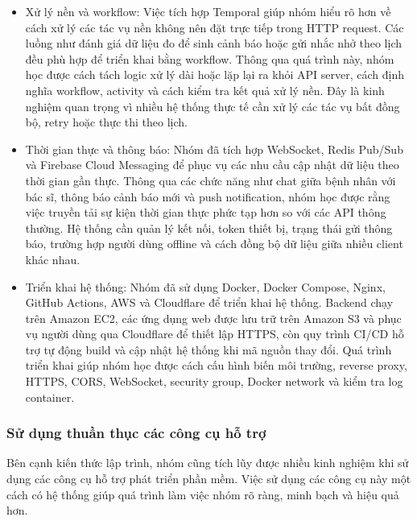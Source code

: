 \begin{itemize}
    \item Xử lý nền và workflow: Việc tích hợp Temporal giúp nhóm hiểu rõ hơn về cách xử lý các tác vụ nền không nên đặt trực tiếp trong HTTP request. Các luồng như đánh giá dữ liệu đo để sinh cảnh báo hoặc gửi nhắc nhở theo lịch đều phù hợp để triển khai bằng workflow. Thông qua quá trình này, nhóm học được cách tách logic xử lý dài hoặc lặp lại ra khỏi API server, cách định nghĩa workflow, activity và cách kiểm tra kết quả xử lý nền. Đây là kinh nghiệm quan trọng vì nhiều hệ thống thực tế cần xử lý các tác vụ bất đồng bộ, retry hoặc thực thi theo lịch.

    \item Thời gian thực và thông báo: Nhóm đã tích hợp WebSocket, Redis Pub/Sub và Firebase Cloud Messaging để phục vụ các nhu cầu cập nhật dữ liệu theo thời gian gần thực. Thông qua các chức năng như chat giữa bệnh nhân với bác sĩ, thông báo cảnh báo mới và push notification, nhóm học được rằng việc truyền tải sự kiện thời gian thực phức tạp hơn so với các API thông thường. Hệ thống cần quản lý kết nối, token thiết bị, trạng thái gửi thông báo, trường hợp người dùng offline và cách đồng bộ dữ liệu giữa nhiều client khác nhau.

    \item Triển khai hệ thống: Nhóm đã sử dụng Docker, Docker Compose, Nginx, GitHub Actions, AWS và Cloudflare để triển khai hệ thống. Backend chạy trên Amazon EC2, các ứng dụng web được lưu trữ trên Amazon S3 và phục vụ người dùng qua Cloudflare để thiết lập HTTPS, còn quy trình CI/CD hỗ trợ tự động build và cập nhật hệ thống khi mã nguồn thay đổi. Quá trình triển khai giúp nhóm học được cách cấu hình biến môi trường, reverse proxy, HTTPS, CORS, WebSocket, security group, Docker network và kiểm tra log container.
\end{itemize}

\subsubsection{Sử dụng thuần thục các công cụ hỗ trợ}
\par Bên cạnh kiến thức lập trình, nhóm cũng tích lũy được nhiều kinh nghiệm khi sử dụng các công cụ hỗ trợ phát triển phần mềm. Việc sử dụng các công cụ này một cách có hệ thống giúp quá trình làm việc nhóm rõ ràng, minh bạch và hiệu quả hơn.


